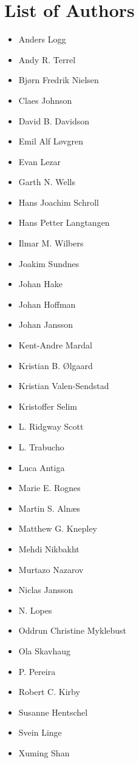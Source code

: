 \chapter*{List of Authors}



\begin{itemize}
\item
  Anders Logg
\item
  Andy R. Terrel
\item
  Bj\o{}rn Fredrik Nielsen
\item
  Claes Johnson
\item
  David B. Davidson
\item
  Emil Alf L{\o}vgren
\item
  Evan Lezar
\item
  Garth N. Wells
\item
  Hans Joachim Schroll
\item
  Hans Petter Langtangen
\item
  Ilmar M. Wilbers
\item
  Joakim Sundnes
\item
  Johan Hake
\item
  Johan Hoffman
\item
  Johan Jansson
\item
  Kent-Andre Mardal
\item
  Kristian B. \O{}lgaard
\item
  Kristian Valen-Sendstad
\item
  Kristoffer Selim
\item
  L. Ridgway Scott
\item
  L. Trabucho
\item
  Luca Antiga
\item
  Marie E. Rognes
\item
  Martin S. Aln{\ae}s
\item
  Matthew G. Knepley
\item
  Mehdi Nikbakht
\item
  Murtazo Nazarov
\item
  Niclas Jansson
\item
  N. Lopes
\item
  Oddrun Christine Myklebust
\item
  Ola Skavhaug
\item
  P. Pereira
\item
  Robert C. Kirby
\item
  Susanne Hentschel
\item
  Svein Linge
\item
  Xuming Shan
\end{itemize}
